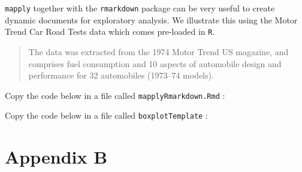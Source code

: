 \documentclass[]{book}
\begin{document}
\texttt{mapply} together with the \texttt{rmarkdown} package
\citep{R-rmarkdown} can be very useful to create dynamic documents for
exploratory analysis. We illustrate this using the Motor Trend Car Road
Tests data which comes pre-loaded in \texttt{R}.

\begin{quote}
The data was extracted from the 1974 Motor Trend US magazine, and
comprises fuel consumption and 10 aspects of automobile design and
performance for 32 automobiles (1973--74 models).
\end{quote}

Copy the code below in a file called \texttt{mapplyRmarkdown.Rmd} :

Copy the code below in a file called \texttt{boxplotTemplate} :

\chapter{Appendix B}\label{appendix-b}


\end{document}
